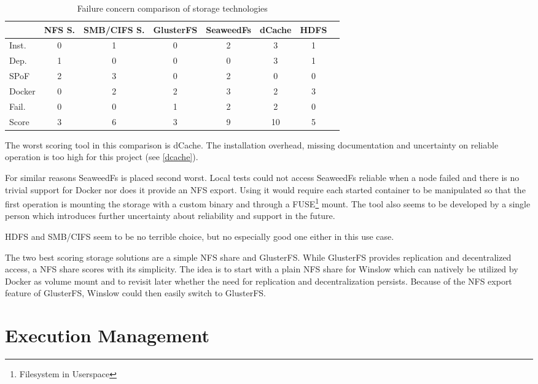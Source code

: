 \begin{table}[H]
	\begin{tabular}{l|c|c|c|c|c|c|c}
				& NFS S.& SMB/CIFS S.& GlusterFS & SeaweedFs	& dCache 	& HDFS \\
		\hline
		Inst. 	& 0 	& 1 		& 0 		& 2 		& 3			& 1 \\
		Dep. 	& 1 	& 0			& 0 		& 0 		& 3 		& 1 \\
		SPoF 	& 2		& 3			& 0			& 2 		& 0			& 0 \\
		Docker 	& 0 	& 2 		& 2 		& 3 		& 2 		& 3 \\
		Fail.	& 0		& 0			& 1			& 2			& 2			& 0 \\
		\hline
		Score 	& 3		& 6			& 3			& 9			& 10		& 5 \\
	\end{tabular}
	\caption{Failure concern comparison of storage technologies}
	\label{comparision:storage}
\end{table}

The worst scoring tool in this comparison is dCache.
The installation overhead, missing documentation and uncertainty on reliable operation is too high for this project (see \autoref{dcache}).

For similar reasons SeaweedFs is placed second worst.
Local tests could not access SeaweedFs reliable when a node failed and there is no trivial support for Docker nor does it provide an NFS export.
Using it would require each started container to be manipulated so that the first operation is mounting the storage with a custom binary and through a FUSE\footnote{Filesystem in Userspace} mount.
The tool also seems to be developed by a single person which introduces further uncertainty about reliability and support in the future.

HDFS and SMB/CIFS seem to be no terrible choice, but no especially good one either in this use case.

The two best scoring storage solutions are a simple NFS share and GlusterFS.
While GlusterFS provides replication and decentralized access, a NFS share scores with its simplicity.
The idea is to start with a plain NFS share for Winslow which can natively be utilized by Docker as volume mount and to revisit later whether the need for replication and decentralization persists.
Because of the NFS export feature of GlusterFS, Winslow could then easily switch to GlusterFS.



\section{Execution Management}

